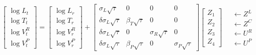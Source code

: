 \documentclass{article}
\begin{document}
\begin{align}
\begin{bmatrix}
    \log L_t \\ \log T_t \\ \log V^R_t \\ \log V^P_t 
\end{bmatrix}
=
\begin{bmatrix}
    \log L_r \\ \log T_r \\ \log V^R_r \\ \log V^P_r 
\end{bmatrix}
+
\begin{bmatrix}
    \sigma_L \sqrt{\tau} &  0  & 0  & 0  \\
    \delta \sigma_L \sqrt{\tau}  &  \beta_T \sqrt{\tau}  & 0  &   0 \\
    \delta \sigma_L \sqrt{\tau}  &  0        & \sigma_R \sqrt{\tau}  &   0 \\
    \delta \sigma_L \sqrt{\tau}  &  \beta_P \sqrt{\tau}  & 0  &   \sigma_P\sqrt{\tau}  
\end{bmatrix}
\begin{bmatrix}
    Z_1 \\ Z_2 \\ Z_3 \\ Z_4
\end{bmatrix}
\quad \begin{matrix}
    \leftarrow Z^L \\
    \leftarrow Z^C \\
    \leftarrow U^R \\
    \leftarrow U^P 
\end{matrix}
\end{align}
\end{document}

